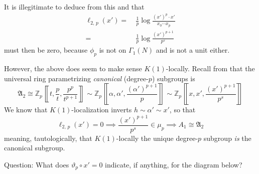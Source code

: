 \documentclass{rs}
\theoremstyle{definition}
\theoremstyle{remark}
\newcommand{\mb}[1]{\mathbb{#1}}
\newcommand{\mf}[1]{\mathfrak{#1}}
\newcommand{\BZ}{{\mb Z}}
\newcommand{\DR}{{\scriptscriptstyle \rm DR}}
\newcommand{\A}{\alpha}
\newcommand{\G}{\Gamma}
\newcommand{\lb}{\llbracket}
\newcommand{\rb}{\rrbracket}
\renewcommand{\=}{\approx}
\renewcommand{\-}{\sim}
\numberwithin{equation}{section}
\begin{document}
It is illegitimate to deduce from this and \cite[Theorem 4.13]{ho} that 
\[
 \begin{split}
  \ell_{2,\,p}(x') = & ~ \frac{1}{p} \log \frac{(x')^p \cdot x'}{x_0 \cdots x_p} \\
                   = & ~ \frac{1}{p} \log \frac{(x')^{p + 1}}{p^s} 
 \end{split}
\]
must then be zero, because $\phi_p$ is not on $\G_1(N)$ and is not a unit either.  

However, the above does seem to make sense $K(1)$-locally.  
Recall from \cite[Definition above Theorem E]{can} that the universal ring parametrizing {\em canonical} (degree-$p$) subgroups is 
\[
 {\mf A_2} \cong \BZ_p \left\lb t, \frac{p}{t}, \frac{p^p}{t^{p+1}} \right\rb 
           \sim \BZ_p \left\lb \A, \A', \frac{(\A')^{p + 1}}{p} \right\rb 
           \sim \BZ_p \left\lb x, x', \frac{(x')^{p + 1}}{p^s} \right\rb 
\]
We know that $K(1)$-localization inverts $h \sim \A' \sim x'$, so that 
\[
 \ell_{2,\,p}(x') = 0 \implies \frac{(x')^{p + 1}}{p^s} \in \mu_p \implies A_1 \cong {\mf A_2} 
\]
meaning, tautologically, that $K(1)$-locally the unique degree-$p$ subgroup {\em is} the canonical subgroup.  

Question: What does $\vartheta_p \circ x' = 0$ indicate, if anything, for the diagram below?  \cite[Appendices 1 and 2]{padicprop} 

\begin{center}
\end{center}
\end{document}
